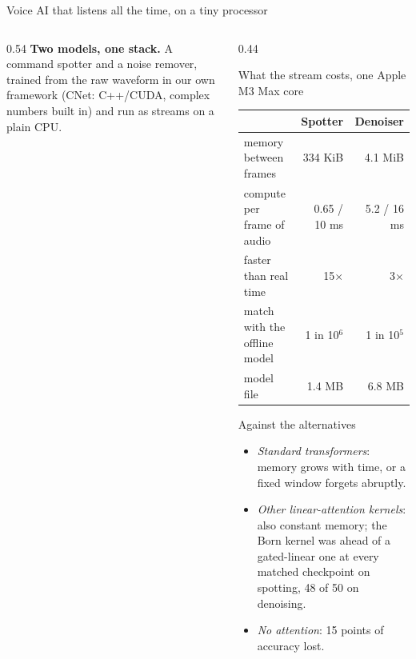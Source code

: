 \documentclass[aspectratio=169,10pt]{beamer}
\begin{document}
\begin{frame}{Voice AI that listens all the time, on a tiny processor}
\begin{columns}[T]
\begin{column}{0.54\textwidth}
\medskip
\textbf{Two models, one stack.} A command spotter and a noise remover, trained from the raw waveform in our own framework (CNet: C++/CUDA, complex numbers built in) and run as streams on a plain CPU.
\end{column}
\begin{column}{0.44\textwidth}
\begin{block}{What the stream costs, one Apple M3 Max core}
\scriptsize\setlength{\tabcolsep}{3pt}
\begin{tabular}{@{}lrr@{}}
\toprule
 & Spotter & Denoiser \\
\midrule
memory between frames & 334 KiB & 4.1 MiB \\
compute per frame of audio & 0.65 / 10 ms & 5.2 / 16 ms \\
faster than real time & 15$\times$ & 3$\times$ \\
match with the offline model & 1 in 10$^6$ & 1 in 10$^5$ \\
model file & 1.4 MB & 6.8 MB \\
\bottomrule
\end{tabular}
\end{block}
\begin{block}{Against the alternatives}
\scriptsize
\begin{itemize}
\item \emph{Standard transformers}: memory grows with time, or a fixed window forgets abruptly.
\item \emph{Other linear-attention kernels}: also constant memory; the Born kernel was ahead of a gated-linear one at every matched checkpoint on spotting, 48 of 50 on denoising.
\item \emph{No attention}: 15 points of accuracy lost.
\end{itemize}
\end{block}
\end{column}
\end{columns}
\end{frame}
\end{document}
